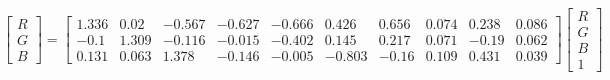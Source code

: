 \begin{equation}
\begin{bmatrix}
  R \\ G \\ B 
\end{bmatrix}=
\left[\begin{matrix}1.336 & 0.02 & -0.567 & -0.627 & -0.666 & 0.426 & 0.656 & 0.074 & 0.238 & 0.086\\ 
-0.1 & 1.309 & -0.116 & -0.015 & -0.402 & 0.145 & 0.217 & 0.071 & -0.19 & 0.062\\ 
0.131 & 0.063 & 1.378 & -0.146 & -0.005 & -0.803 & -0.16 & 0.109 & 0.431 & 0.039\end{matrix}\right]
\begin{bmatrix}
  R \\ G \\ B \\ 1 
\end{bmatrix}
\end{equation}
